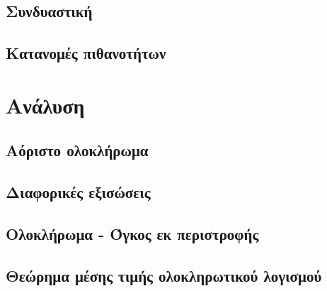 \documentclass[twoside,10pt]{book}
\begin{document}
\section{Συνδυαστική}
\section{Κατανομές πιθανοτήτων}
\chapter{Ανάλυση}
\section{Αόριστο ολοκλήρωμα}
\section{Διαφορικές εξισώσεις}
\section{Ολοκλήρωμα - Όγκος εκ περιστροφής}
\section{Θεώρημα μέσης τιμής ολοκληρωτικού λογισμού}
\end{document}
